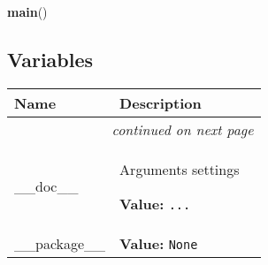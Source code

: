     \label{GoXML:main}

    \vspace{0.5ex}

\hspace{.8\funcindent}\begin{boxedminipage}{\funcwidth}

    \raggedright \textbf{main}()

\setlength{\parskip}{2ex}
\setlength{\parskip}{1ex}
    \end{boxedminipage}



  \subsection{Variables}

    \vspace{-1cm}
\hspace{\varindent}\begin{longtable}{|p{\varnamewidth}|p{\vardescrwidth}|l}
\cline{1-2}
\cline{1-2} \centering \textbf{Name} & \centering \textbf{Description}& \\
\cline{1-2}
\endhead\cline{1-2}\multicolumn{3}{r}{\small\textit{continued on next page}}\\\endfoot\cline{1-2}
\endlastfoot\raggedright \_\-\_\-d\-o\-c\-\_\-\_\- & \raggedright Arguments settings

\textbf{Value:} 
{\tt \texttt{...}}&\\
\cline{1-2}
\raggedright \_\-\_\-p\-a\-c\-k\-a\-g\-e\-\_\-\_\- & \raggedright \textbf{Value:} 
{\tt None}&\\
\cline{1-2}
\end{longtable}

